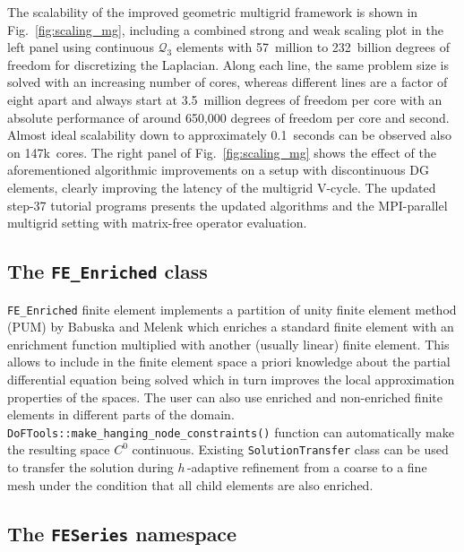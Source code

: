 \documentclass{ansarticle-preprint}
\begin{document}
The scalability of the improved geometric multigrid framework is shown in
Fig.~\ref{fig:scaling_mg}, including a combined strong and weak scaling plot
in the left panel using continuous $\mathcal Q_3$ elements with 57~million to
232~billion degrees of freedom for discretizing the Laplacian. Along each
line, the same problem size is solved with an increasing number of cores,
whereas different lines are a factor of eight apart and always start at
3.5~million degrees of freedom per core with an absolute performance of around
650,000 degrees of freedom per core and second. Almost ideal scalability down
to approximately 0.1~seconds can be observed also on 147k~cores. The right
panel of Fig.~\ref{fig:scaling_mg} shows the effect of the aforementioned
algorithmic improvements on a setup with discontinuous DG elements, clearly
improving the latency of the multigrid V-cycle. The updated step-37 tutorial
programs presents the updated algorithms and the MPI-parallel multigrid
setting with matrix-free operator evaluation.



\subsection{The \texttt{FE\_Enriched} class}

\verb!FE_Enriched! finite element implements a partition of unity finite element method (PUM) by Babuska and Melenk which enriches a standard finite element with an enrichment function multiplied with another (usually linear) finite element. This allows to include in the finite element space a priori knowledge about the partial differential equation being solved which in turn improves the local approximation properties of the spaces. The user can also use enriched and non-enriched finite elements in different parts of the domain.
\verb|DoFTools::make_hanging_node_constraints()| function can automatically make the resulting space $C^0$ continuous.
Existing \verb|SolutionTransfer| class can be used to transfer the solution during $h$\,-adaptive refinement from a coarse to a fine mesh under the condition that all child elements are also enriched.

\subsection{The \texttt{FESeries} namespace}
\end{document}
